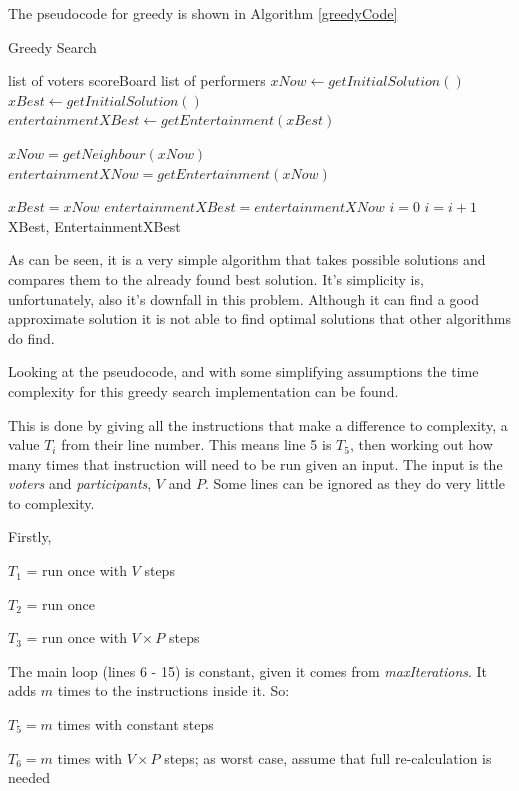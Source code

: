 \documentclass[12pt]{report}
\begin{document}
The pseudocode for greedy is shown in Algorithm \ref{greedyCode}

\begin{algorithm}
\caption{Greedy Search}
\label{greedyCode}
\begin{algorithmic}[1]
\REQUIRE list of voters
\REQUIRE scoreBoard
\REQUIRE list of performers
\STATE $xNow \leftarrow getInitialSolution()$
\STATE $xBest \leftarrow getInitialSolution()$
\STATE $entertainmentXBest \leftarrow getEntertainment(xBest)$

\STATE $xNow = getNeighbour(xNow)$
\STATE $entertainmentXNow = getEntertainment(xNow)$

\STATE $xBest = xNow$
\STATE $entertainmentXBest = entertainmentXNow$
\STATE $i = 0$
\ENDIF
\STATE $i = i + 1$
\ENDWHILE
\RETURN XBest, EntertainmentXBest
\end{algorithmic}
\end{algorithm}

As can be seen, it is a very simple algorithm that takes possible solutions and compares them to the already found best solution. It's simplicity is, unfortunately, also it's downfall in this problem. Although it can find a good approximate solution it is not able to find optimal solutions that other algorithms do find.

Looking at the pseudocode, and with some simplifying assumptions the time complexity for this greedy search implementation can be found.

This is done by giving all the instructions that make a difference to complexity, a value $T_i$ from their line number. This means line 5 is $T_5$, then working out how many times that instruction will need to be run given an input. The input is the \textit{voters} and \textit{participants}, $V$ and $P$. Some lines can be ignored as they do very little to complexity.

Firstly,

$T_1$ = run once with $V$ steps

$T_2$ = run once

$T_3$ = run once with $V \times P$ steps

The main loop (lines 6 - 15) is constant, given it comes from \textit{maxIterations}. It adds $m$ times to the instructions inside it. So:

$T_5 = m$ times with constant steps

$T_6 = m$ times with $V \times P$ steps; as worst case, assume that full re-calculation is needed
\end{document}
